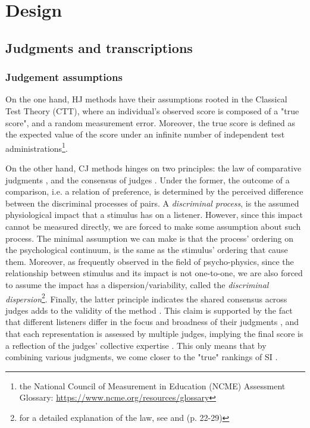 \section{Design}
%
\subsection{Judgments and transcriptions}
%
\subsubsection{Judgement assumptions}
%
On the one hand, HJ methods have their assumptions rooted in the Classical Test Theory (CTT), where an individual's observed score is composed of a "true score", and a random measurement error. Moreover, the true score is defined as the expected value of the score under an infinite number of independent test administrations\footnote{the National Council of Measurement in Education (NCME) Assessment Glossary: \url{ https://www.ncme.org/resources/glossary}}.

On the other hand, CJ methods hinges on two principles: the law of comparative judgments \citep{Thurstone_1927}, and the consensus of judges \citep{Lesterhuis_2018}. Under the former, the outcome of a comparison, i.e. a relation of preference, is determined by the perceived difference between the discriminal processes of pairs. A \textit{discriminal process}, is the assumed physiological impact that a stimulus has on a listener. However, since this impact cannot be measured directly, we are forced to make some assumption about such process. The minimal assumption we can make is that the process' ordering on the psychological continuum, is the same as the stimulus' ordering that cause them. Moreover, as frequently observed in the field of psycho-physics, since the relationship between stimulus and its impact is not one-to-one, we are also forced to assume the impact has a dispersion/variability, called the \textit{discriminal dispersion}\footnote{for a detailed explanation of the law, see \citet{Thurstone_1927} and \citet{Verhavert_2018} (p. 22-29)}. Finally, the latter principle indicates the shared consensus across judges adds to the validity of the method \citep{Lesterhuis_2018}. This claim is supported by the fact that different listeners differ in the focus and broadness of their judgments \citep{Lesterhuis_2018}, and that each representation is assessed by multiple judges, implying the final score is a reflection of the judges’ collective expertise \citep{Pollitt_2012b}. This only means that by combining various judgments, we come closer to the "true" rankings of SI \citep{Lee_et_al_2014}.
%
%
